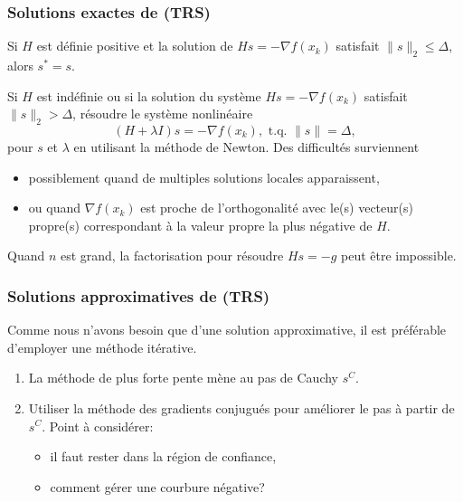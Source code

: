 \documentclass[t,usepdftitle=false]{beamer}
\begin{document}
\begin{frame}
\frametitle{Solutions exactes de (TRS)}

Si $H$ est définie positive et la solution de $Hs = -\nabla f(x_k)$ satisfait $\| s \|_2 \leq \Delta$, alors $s^*  = s$.

\mbox{}

Si $H$ est indéfinie ou si la solution du système $Hs = -\nabla f(x_k)$ satisfait $\| s \|_2 > \Delta$, résoudre le système nonlinéaire
$$
(H + \lambda I)s = -\nabla f(x_k),\mbox{ t.q. } \| s \| = \Delta,
$$
pour $s$ et $\lambda$ en utilisant la méthode de Newton.
Des difficultés surviennent
\begin{itemize}
\item
possiblement quand de multiples solutions locales apparaissent,
\item
ou quand $\nabla f(x_k)$ est proche de l'orthogonalité avec le(s) vecteur(s) propre(s) correspondant à la valeur propre la plus négative de $H$.
\end{itemize}
Quand $n$ est grand, la factorisation pour résoudre $Hs = -g$ peut être impossible.

\end{frame}

\begin{frame}
\frametitle{Solutions approximatives de (TRS)}

Comme nous n'avons besoin que d'une solution approximative, il est préférable d'employer une méthode itérative.
\begin{enumerate}
\item
La méthode de plus forte pente mène au pas de Cauchy $s^C$.
\item
Utiliser la méthode des gradients conjugués pour améliorer le pas à partir de $s^C$. Point à considérer:
\begin{itemize}
	\item il faut rester dans la région de confiance,
	\item comment gérer une courbure négative?
\end{itemize}
\end{enumerate}

\end{frame}
\end{document}
